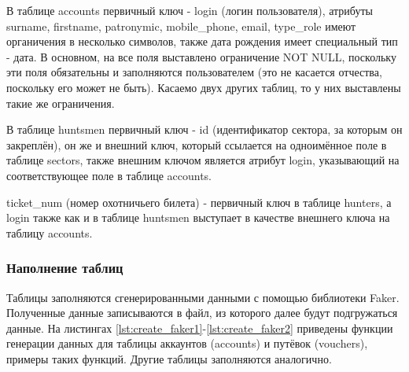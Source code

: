 		В таблице accounts первичный ключ - login (логин пользователя), атрибуты surname, firstname, patronymic, mobile\_phone, email, type\_role имеют органичения в несколько символов, также дата рождения имеет специальный тип - дата. В основном, на все поля выставлено ограничение NOT NULL, поскольку эти поля обязательны и заполняются пользователем (это не касается отчества, поскольку его может не быть). Касаемо двух других таблиц, то у них выставлены такие же ограничения.
		
		В таблице huntsmen первичный ключ - id (идентификатор сектора, за которым он закреплён), он же и внешний ключ, который ссылается на одноимённое поле в таблице sectors, также внешним ключом является атрибут login, указывающий на соответствующее поле в таблице accounts.
		
		ticket\_num (номер охотничьего билета) - первичный ключ в таблице hunters, а login также как и в таблице huntsmen выступает в качестве внешнего ключа на таблицу accounts.
			
		\subsubsection{Наполнение таблиц}
		Таблицы заполняются сгенерированными данными с помощью библиотеки Faker. Полученные данные записываются в файл, из которого далее будут подгружаться данные. На листингах \ref{lst:create_faker1}-\ref{lst:create_faker2} приведены функции генерации данных для таблицы аккаунтов (accounts) и путёвок (vouchers), примеры таких функций. Другие таблицы заполняются аналогично.
		
